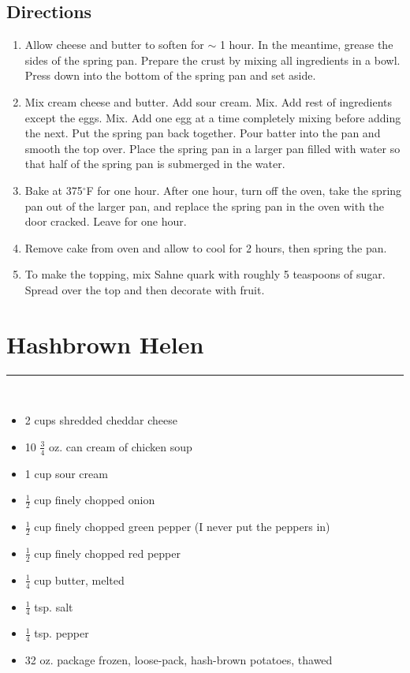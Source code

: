 \documentclass[12pt]{article}
\def \hzline{\noindent \rule[0mm]{\textwidth}{1pt}}
\begin{document}
\subsection*{Directions}
\begin{enumerate}
  \item Allow cheese and butter to soften for $\sim$ 1 hour. In the meantime, grease the sides of the spring pan. Prepare the crust by mixing all ingredients in a bowl. Press down into the bottom of the spring pan and set aside. 
  \item Mix cream cheese and butter. Add sour cream. Mix. Add rest of ingredients except the eggs. Mix. Add one egg at a time completely mixing before adding the next. Put the spring pan back together. Pour batter into the pan and smooth the top over. Place the spring pan in a larger pan filled with water so that half of the spring pan is submerged in the water.
  \item Bake at 375$^\circ$F for one hour. After one hour, turn off the oven, take the spring pan out of the larger pan, and replace the spring pan in the oven with the door cracked. Leave for one hour. 
  \item Remove cake from oven and allow to cool for 2 hours, then spring the pan.
  \item To make the topping, mix Sahne quark with roughly 5 teaspoons of sugar. Spread over the top and then decorate with fruit.
\end{enumerate}




\section*{Hashbrown Helen} \hzline \\
\begin{itemize}
  \item 2 cups shredded cheddar cheese
  \item 10 $\frac{3}{4}$ oz. can cream of chicken soup
  \item 1 cup sour cream
  \item $\frac{1}{2}$ cup finely chopped onion
  \item $\frac{1}{2}$ cup finely chopped green pepper (I never put the peppers in)
  \item $\frac{1}{2}$ cup finely chopped red pepper
  \item $\frac{1}{4}$ cup butter, melted
  \item $\frac{1}{4}$ tsp. salt
  \item $\frac{1}{4}$ tsp. pepper
  \item 32 oz. package frozen, loose-pack, hash-brown potatoes, thawed
\end{itemize}
\end{document}
